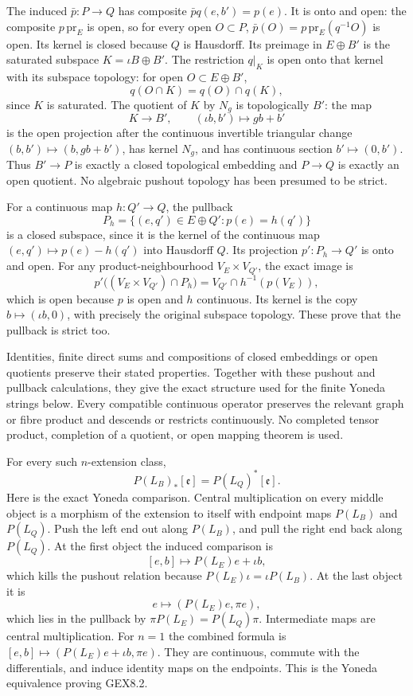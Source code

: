 The induced \(\bar p:P\to Q\) has composite \(\bar p q(e,b')=p(e)\). It
is onto and open: the composite \(p\,\mathrm{pr}_E\) is open, so for
every open \(O\subset P\), \(\bar p(O)=p\,\mathrm{pr}_E(q^{-1}O)\) is
open. Its kernel is closed because \(Q\) is Hausdorff. Its preimage in
\(E\oplus B'\) is the saturated subspace \(K=\iota B\oplus B'\). The
restriction \(q|_K\) is open onto that kernel with its subspace
topology: for open \(O\subset E\oplus B'\), \[
 q(O\cap K)=q(O)\cap q(K),
\tag{GEX8.1a}
\] since \(K\) is saturated. The quotient of \(K\) by \(N_g\) is
topologically \(B'\): the map \[
 K\to B',\qquad(\iota b,b')\mapsto gb+b'
\tag{GEX8.1b}
\] is the open projection after the continuous invertible triangular
change \((b,b')\mapsto(b,gb+b')\), has kernel \(N_g\), and has
continuous section \(b'\mapsto(0,b')\). Thus \(B'\to P\) is exactly a
closed topological embedding and \(P\to Q\) is exactly an open quotient.
No algebraic pushout topology has been presumed to be strict.

For a continuous map \(h:Q'\to Q\), the pullback \[
 P_h=\{(e,q')\in E\oplus Q':p(e)=h(q')\}
\] is a closed subspace, since it is the kernel of the continuous map
\((e,q')\mapsto p(e)-h(q')\) into Hausdorff \(Q\). Its projection
\(p':P_h\to Q'\) is onto and open. For any product-neighbourhood
\(V_E\times V_{Q'}\), the exact image is \[
 p'\big((V_E\times V_{Q'})\cap P_h\big)
 =V_{Q'}\cap h^{-1}(p(V_E)),
\tag{GEX8.1c}
\] which is open because \(p\) is open and \(h\) continuous. Its kernel
is the copy \(b\mapsto(\iota b,0)\), with precisely the original
subspace topology. These prove that the pullback is strict too.

Identities, finite direct sums and compositions of closed embeddings or
open quotients preserve their stated properties. Together with these
pushout and pullback calculations, they give the exact structure used
for the finite Yoneda strings below. Every compatible continuous
operator preserves the relevant graph or fibre product and descends or
restricts continuously. No completed tensor product, completion of a
quotient, or open mapping theorem is used.

For every such \(n\)-extension class, \[
P(L_B)_*[\mathfrak e]=P(L_Q)^*[\mathfrak e].
\tag{GEX8.2}
\] Here is the exact Yoneda comparison. Central multiplication on every
middle object is a morphism of the extension to itself with endpoint
maps \(P(L_B)\) and \(P(L_Q)\). Push the left end out along \(P(L_B)\),
and pull the right end back along \(P(L_Q)\). At the first object the
induced comparison is \[
[e,b]\longmapsto P(L_E)e+\iota b,
\] which kills the pushout relation because
\(P(L_E)\iota=\iota P(L_B)\). At the last object it is \[
e\longmapsto(P(L_E)e,\pi e),
\] which lies in the pullback by \(\pi P(L_E)=P(L_Q)\pi\). Intermediate
maps are central multiplication. For \(n=1\) the combined formula is
\([e,b]\mapsto(P(L_E)e+\iota b,\pi e)\). They are continuous, commute
with the differentials, and induce identity maps on the endpoints. This
is the Yoneda equivalence proving GEX8.2.


